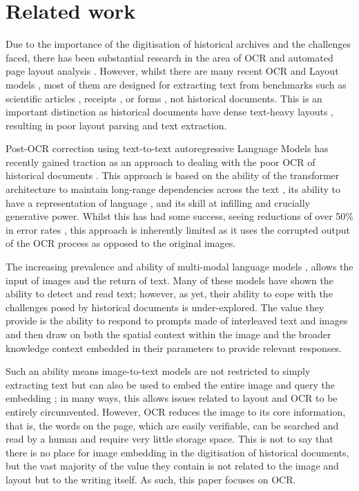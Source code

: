 \section{Related work}
Due to the importance of the digitisation of historical archives and the challenges faced, there has been substantial research in the area of OCR and automated page layout analysis \cite{girdhar_digitizing_2024}. However, whilst there are many recent OCR and Layout models \cite{wei_general_2024, da_vision_2023, zhang_vsr_2021, li_dit_2022, huang_layoutlmv3_2022}, most of them are designed for extracting text from benchmarks such as scientific articles \cite{zhong_publaynet_2019}, receipts \cite{park_cord_2019}, or forms \cite{jaume_funsd_2019}, not historical documents. This is an important distinction as historical documents have dense text-heavy layouts \cite{sven_page_2022}, resulting in poor layout parsing and text extraction. 

Post-OCR correction using text-to-text autoregressive Language Models has recently gained traction as an approach to dealing with the poor OCR of historical documents \cite{boros_post-correction_2024, thomas_leveraging_2024, bourne_clocr-c_2024, bourne_scrambled_2024-1, kanerva_ocr_2025}. This approach is based on the ability of the transformer architecture to maintain long-range dependencies across the text \cite{vaswani_attention_2017}, its ability to have a representation of language \cite{kallini_mission_2024}, and its skill at infilling \cite{devlin_bert_2019} and crucially generative power. Whilst this has had some success, seeing reductions of over 50\% in error rates \cite{thomas_leveraging_2024, bourne_scrambled_2024-1}, this approach is inherently limited as it uses the corrupted output of the OCR process as opposed to the original images. 

The increasing prevalence and ability of multi-modal language models \cite{agrawal_pixtral_2024, team_gemini_2024, openai_gpt-4_2024, qwen_qwen25_2025, dubey_llama_2024}, allows the input of images and the return of text. Many of these models have shown the ability to detect and read text; however, as yet, their ability to cope with the challenges posed by historical documents is under-explored. The value they provide is the ability to respond to prompts made of interleaved text and images and then draw on both the spatial context within the image and the broader knowledge context embedded in their parameters to provide relevant responses. 

Such an ability means image-to-text models are not restricted to simply extracting text but can also be used to embed the entire image and query the embedding \cite{faysse_colpali_2024}; in many ways, this allows issues related to layout and OCR to be entirely circumvented. However, OCR reduces the image to its core information, that is, the words on the page, which are easily verifiable, can be searched and read by a human and require very little storage space. This is not to say that there is no place for image embedding in the digitisation of historical documents, but the vast majority of the value they contain is not related to the image and layout but to the writing itself. As such, this paper focuses on OCR.

